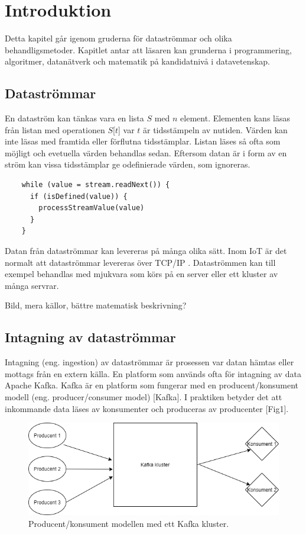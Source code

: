 \chapter{Introduktion}

Detta kapitel går igenom gruderna för dataströmmar och olika behandligsmetoder. Kapitlet antar att
läsaren kan grunderna i programmering, algoritmer, datanätverk och matematik på kandidatnivå i datavetenskap.

\section{Dataströmmar}

En dataström kan tänkas vara en lista $S$ med $n$ element. Elementen kans läsas från listan med operationen $S$[$t$] 
var $t$ är tidsstämpeln av nutiden. Värden kan inte läsas med framtida eller förflutna tidsstämplar. Listan läses
så ofta som möjligt och evetuella värden behandlas sedan. Eftersom datan är i form av en ström kan vissa 
tidsstämplar ge odefinierade värden, som ignoreras.

\begin{verbatim}
    while (value = stream.readNext()) {
      if (isDefined(value)) {
        processStreamValue(value)
      }
    }
\end{verbatim}

Datan från dataströmmar kan levereras på många olika sätt. Inom IoT är det normalt att dataströmmar 
levereras över TCP/IP \citep{shang2016challenges}. Dataströmmen kan till exempel behandlas med mjukvara som körs på en server eller ett kluster av många servrar.

Bild, mera källor, bättre matematisk beskrivning?

\section{Intagning av dataströmmar}

Intagning (eng. ingestion) av dataströmmar är prosessen var datan hämtas eller mottags från en extern källa.
En platform som används ofta för intagning av data Apache Kafka. Kafka är en platform som fungerar med
en producent/konsument modell (eng. producer/consumer model) [Kafka]. I praktiken betyder det att inkommande data läses av konsumenter och produceras av producenter [Fig1].

\begin{figure}[h]
    \centering
    \includegraphics[scale=0.7]{src/thesis/img/prod-cons-model.png}
    \caption{Producent/konsument modellen med ett Kafka kluster.}
    \label{fig:mesh1}
\end{figure}

